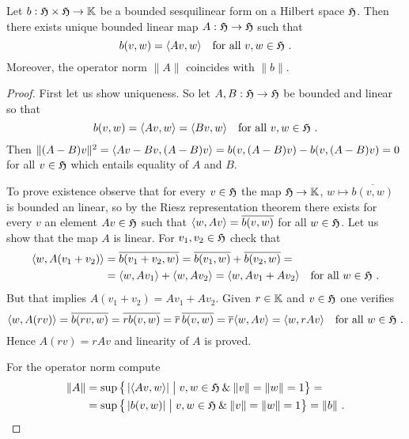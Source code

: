 \begin{corollary}
\label{thm:correspondence-bounded-sesquilinear-forms-bounded-operators}
  Let $b:\mathfrak{H} \times \mathfrak{H}\to \mathbb{K}$ be a bounded sesquilinear form on a Hilbert space $\mathfrak{H}$. Then there exists
  unique bounded linear map $A : \mathfrak{H} \to \mathfrak{H}$ such that
  \[
      b(v,w)  = \langle Av,w \rangle \quad \text{for all } v,w\in \mathfrak{H} \ .
  \]
  Moreover, the operator norm $\| A \|$ coincides with $\| b\|$. 
\end{corollary}
\begin{proof}
  First let us show uniqueness. So let $A,B  : \mathfrak{H} \to \mathfrak{H}$ be bounded and linear so that
  \[
          b(v,w)  = \langle Av,w \rangle = \langle Bv,w \rangle  \quad \text{for all } v,w\in \mathfrak{H} \ .
  \]
  Then $ \|(A-B)v \|^2 = \langle Av-Bv,(A-B)v \rangle = b(v,(A-B)v) - b(v,(A-B)v)=  0$ for all $v\in \mathfrak{H}$ 
  which entails equality of $A$ and $B$. 

  To prove existence observe that for every $v\in \mathfrak{H}$ the map $\mathfrak{H} \to \mathbb{K}$, $w \mapsto \overline{b(v,w)}$
  is bounded an linear, so by the Riesz representation theorem there exists for every $v$ an element $Av \in \mathfrak{H}$ 
  such that $\langle w,Av \rangle =  \overline{b(v,w)}$ for all $w\in \mathfrak{H}$. 
  Let us show that the map $A$ is linear. 
  For $v_1,v_2\in \mathfrak{H}$ check that
  \begin{equation*}
    \begin{split}
      \langle w,A(v_1+v_2) \rangle & =  \overline{b(v_1+v_2,w)} = \overline{b(v_1,w)}+ \overline{b(v_2,w)} = \\
      & = \langle w,Av_1 \rangle  +\langle w,Av_2 \rangle =  \langle w,Av_1+Av_2 \rangle \quad \text{for all } w\in \mathfrak{H} \ . 
    \end{split}
  \end{equation*}
  But that implies $A(v_1+v_2) = Av_1+Av_2$. Given $r\in \mathbb{K}$ and $v\in\mathfrak{H}$ one verifies
  \[
    \langle w,A(rv) \rangle =  \overline{b(rv,w)} = \overline{rb(v,w)} = \overline{r} \, \overline{b(v,w)}
    =  \overline{r}  \langle w,Av \rangle =  \langle w,rAv \rangle \quad \text{for all } w\in \mathfrak{H} \ . 
  \]
  Hence $A(rv) = r Av$ and linearity of $A$ is proved. 
  
  For the operator norm compute
  \begin{equation*}
    \begin{split}
    \| A \| & = \sup \big\{ \left|\langle Av,w \rangle \right| \bigm\vert v,w \in \mathfrak{H} \: \& \: \|v\| = \|w\| =1 \big\} = \\
    & = \sup \big\{ \left| b(v,w) \right| \bigm\vert v,w \in \mathfrak{H} \: \& \: \|v\| = \|w\| =1 \big\} = \| b\| \ .
   \end{split}
  \end{equation*}
\end{proof}

